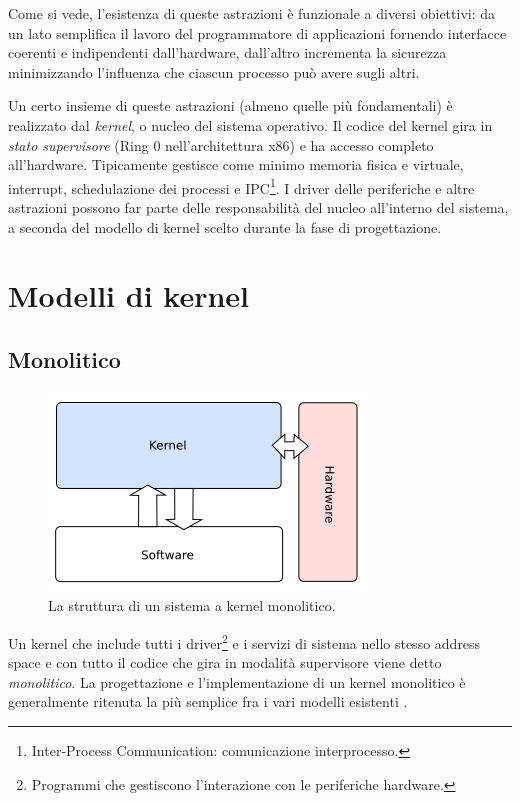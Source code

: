 \documentclass[12pt,a4paper]{report}
\begin{document}
		Come si vede, l'esistenza di queste astrazioni è funzionale a diversi obiettivi: da un lato semplifica
		il lavoro del programmatore di applicazioni fornendo interfacce coerenti e indipendenti dall'hardware,
		dall'altro incrementa la sicurezza minimizzando l'influenza che ciascun processo può avere sugli altri.
		
		Un certo insieme di queste astrazioni (almeno quelle più fondamentali) è realizzato dal \emph{kernel},
		o nucleo del sistema operativo.
		Il codice del kernel gira in \emph{stato supervisore} (Ring 0 nell'architettura x86) e ha accesso completo
		all'hardware. Tipicamente gestisce come minimo memoria fisica e virtuale, interrupt, schedulazione dei processi e
		IPC\footnote{Inter-Process Communication: comunicazione interprocesso.}. 
		I driver delle periferiche e altre astrazioni possono far parte delle responsabilità del nucleo all'interno del sistema,
		a seconda del modello di kernel scelto durante la fase di progettazione.
	
	\section{Modelli di kernel}
		\subsection{Monolitico}
			\begin{figure}[htbp]
			\centering
			\includegraphics[scale=0.7]{img/monolithic.png}
			\caption{La struttura di un sistema a kernel monolitico. \cite{OSDEV_Monolithic}\label{fig:monolithic}}
			\end{figure}
		
			Un kernel che include tutti i driver\footnote{Programmi che gestiscono l'interazione con le periferiche hardware.} e i servizi di sistema
			nello stesso address space e con tutto il codice che gira in modalità supervisore viene detto \emph{monolitico}.
			La progettazione e l'implementazione di un kernel monolitico è generalmente ritenuta la più semplice fra i vari modelli esistenti \cite{Thompson}.
			
\end{document}
